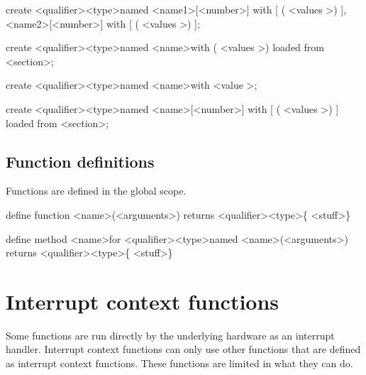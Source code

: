 \documentclass[12pt]{article}
\begin{document}
create \textless qualifier\textgreater \space \textless type\textgreater \space [ ] named \textless name1\textgreater [\textless number\textgreater] with [ ( \textless values \textgreater ) ], \textless name2\textgreater [\textless number\textgreater] with [ ( \textless values \textgreater ) ];

create \textless qualifier\textgreater  \space \textless type\textgreater \space named \textless name\textgreater with ( \textless values \textgreater ) loaded from \textless section\textgreater;

create \textless qualifier\textgreater  \space \textless type\textgreater \space named \textless name\textgreater with \textless value \textgreater;

create \textless qualifier\textgreater \space \textless type\textgreater \space [ ] named \textless name\textgreater [\textless number\textgreater] with [ ( \textless values \textgreater ) ] loaded from \textless section\textgreater;

\subsection {Function definitions}
Functions are defined in the global scope.

define function \textless name\textgreater (\textless arguments\textgreater) returns \textless qualifier\textgreater \space \textless type\textgreater \{ \textless stuff\textgreater \}

define method \textless name\textgreater \space for \textless qualifier\textgreater  \space \textless type\textgreater \space named  \textless name\textgreater \space  (\textless arguments\textgreater) returns \textless qualifier\textgreater \space \textless type\textgreater \{ \textless stuff\textgreater \}

\section {Interrupt context functions}

Some functions are run directly by the underlying hardware as an interrupt handler. Interrupt context functions can only use other functions that are defined as interrupt context functions. These functions are limited in what they can do.
\end{document}
